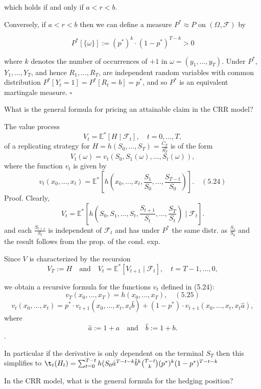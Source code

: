 which holds if and only if \(a < r < b\).

Conversely, if \(a < r < b\) then we can define a measure \(P^* \approx P\) on \((\Omega, \mathcal{F})\) by

\[
P^*[\{\omega\}] := (p^*)^k \cdot (1 - p^*)^{T-k} > 0
\]

where \(k\) denotes the number of occurrences of \(+1\) in \(\omega = (y_1, \ldots, y_T)\). Under \(P^*\), \(Y_1, \ldots, Y_T\), and hence \(R_1, \ldots, R_T\), are independent random variables with common distribution \(P^*[Y_t = 1] = P^*[R_t = b] = p^*\), and so \(P^*\) is an equivalent martingale measure. \(\square\)



What is the general formula for pricing an attainable claim
in the CRR model?


The value process
\[
V_t = \mathbb{E}^*[H \mid \mathcal{F}_t], \quad t = 0, \ldots, T,
\]
of a replicating strategy for \(H = h(S_0, \dots, S_T) = \frac{C_T}{S^0_T} \) is of the form
\[
V_t(\omega) = v_t(S_0, S_1(\omega), \ldots, S_t(\omega)),
\]
where the function \(v_t\) is given by
\[
v_t(x_0, \ldots, x_t) = \mathbb{E}^*\left[ h\left( x_0, \ldots, x_t, \frac{S_1}{S_0}, \ldots, \frac{S_{T-t}}{S_0} \right) \right]. \quad (5.24)
\]
Proof. Clearly,
\[
V_t = \mathbb{E}^* \left[ h \left( S_0, S_1, \ldots, S_t, \frac{S_{t+1}}{S_t}, \ldots, \frac{S_T}{S_t} \right) \mid \mathcal{F}_t \right].
\]
and each \( \frac{S_{t+s}}{S_t}\) is independent of \( \mathcal{F}_t \) and has under \( P^\ast \) the same distr. as \( \frac{S_{s}}{S_0} \)
and the result follows from the prop. of the cond. exp.

Since \(V\) is characterized by the recursion
\[
V_T := H \quad \text{and} \quad V_t = \mathbb{E}^*[V_{t+1} \mid \mathcal{F}_t], \quad t = T-1, \ldots, 0,
\]

we obtain a recursive formula for the functions \(v_t\) defined in (5.24):
\[
v_T(x_0, \ldots, x_T) = h(x_0, \ldots, x_T), \quad (5.25)
\]
\[
v_t(x_0, \ldots, x_t) = p^* \cdot v_{t+1}(x_0, \ldots, x_t, x_t \hat{b}) + (1 - p^*) \cdot v_{t+1}(x_0, \ldots, x_t, x_t \hat{a}),
\]
where
\[
\hat{a} := 1 + a \quad \text{and} \quad \hat{b} := 1 + b.
\].

In particular if the derivative is only dependent on the terminal \( S_T \) then this simplifies to
\( \t_t(H_t) = \sum_{t=0}^{T-t} h(S_0 \hat{a}^{T-t-k}\hat{b}^k \binom{T-t}{k}(p^\ast)^k(1-p^\ast)^{T-t-k} \)



In the CRR model, what is the general formula for the hedging position?

